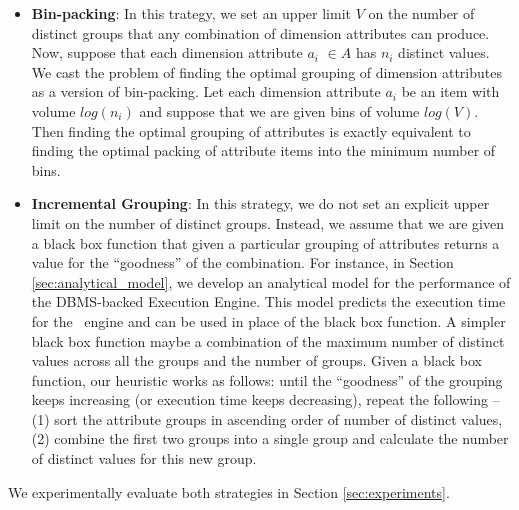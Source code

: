   \begin{itemize} 
  \item {\bf Bin-packing}: In this trategy, we set an upper limit $V$ on the
  number of distinct groups that any combination of dimension attributes can
  produce.
  Now, suppose that each dimension attribute $a_i$ $\in A$ has $n_i$ distinct
  values.
  We cast the problem of finding the optimal grouping of dimension attributes as
  a version of bin-packing.
  Let each dimension attribute $a_i$ be an item with volume $log(n_i)$ and
  suppose that we are given bins of volume $log(V)$.
  Then finding the optimal grouping of attributes is exactly equivalent to
  finding the optimal packing of attribute items into the minimum number of
  bins.
  \item {\bf Incremental Grouping}: In this strategy, we do not set an
  explicit upper limit on the number of distinct groups. 
  Instead, we assume that
  we are given a black box function that given a particular grouping of
  attributes returns a value for the ``goodness'' of the combination. 
  For instance, in
  Section \ref{sec:analytical_model}, we develop an analytical model for the
  performance of the DBMS-backed Execution Engine. 
  This model predicts the execution time for the
  \VizRecDB\ engine and can be used in place of the black box function. 
  A simpler
  black box function maybe a combination of the maximum number of distinct
  values across all the groups and the number of groups. 
  Given a black box
  function, our heuristic works as follows: until the ``goodness'' of the
  grouping keeps increasing (or execution time keeps decreasing), repeat the
  following -- (1) sort the attribute groups in ascending order of number of
  distinct values, (2) combine the first two groups into a single group and
  calculate the number of distinct values for this new group.
\end{itemize} 
We experimentally evaluate both strategies in Section \ref{sec:experiments}.
 
